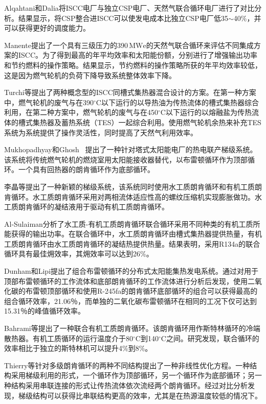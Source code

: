 Alqahtani和Dalia\cite{Alqahtani2016}将ISCC电厂与独立CSP电厂、天然气联合循环电厂进行了对比分析。结果显示，将CSP整合进ISCC可以使发电成本比独立CSP电厂低35$\sim$40\%，并可以获得更好的调度能力。

Manente提出了一个具有三级压力的390$\,\mathrm{MWe}$的天然气联合循环来评估不同集成方案的ISCC。为了得到最高的年平均效率和太阳能份额，分别进行了增强输出功率和节约燃料的操作策略。结果显示，节约燃料的操作策略所获的年平均效率较低，这是因为燃气轮机的负荷下降导致系统整体效率下降。

Turchi等\cite{Turchi2014}提出了两种概念型的ISCC同槽式集热器混合设计的方案。在第一种方案中，燃气轮机的废气与在390$^\circ\mathrm{C}$以下运行的以导热油为传热流体的槽式集热器综合利用，在第二种方案中，燃气轮机的废气与在450$^\circ\mathrm{C}$以下运行的以熔融盐为传热流体的槽式集热器及蓄热系统（TES）一起综合利用。使用燃气轮机余热来补充TES系统为系统提供了操作灵活性，同时提高了天然气利用效率。

Mukhopadhyay和Ghosh~\cite{Mukhopadhyay2016}
提出了一种针对塔式太阳能电厂的热电联产梯级系统。该系统将传统燃气轮机的燃烧室用太阳能接收器替代，以布雷顿循环作为顶部循环。一个具有回热器的朗肯循环作为底部循环。

李晶等\cite{Li2016a}提出了一种新颖的梯级系统，该系统同时使用水工质朗肯循环和有机工质朗肯循环。水工质朗肯循环采用对两相流体适应性高的螺纹压缩机实现膨胀做功。水工质朗肯循环的凝结液用于驱动有机工质朗肯循环。

Al-Sulaiman\cite{AlSulaiman2014}分析了水工质-有机工质朗肯循环联合循环采用不同种类的有机工质所能获得的输出功率。在联合循环中，水工质朗肯循环由槽式集热器提供热量，有机工质朗肯循环由水工质朗肯循环的凝结热提供热量。结果表明，采用R134a的联合循环具有最佳㶲效率，其㶲效率可以达到26\%。

Dunham和Lipi\cite{Dunham2013}提出了组合布雷顿循环的分布式太阳能集热发电系统。通过对用于顶部布雷顿循环的工作流体和底部朗肯循环的工作流体进行分析后发现，使用二氧化碳的布雷顿顶部循环和使用R-245fa的朗肯循环底部循环的组合可以获得最高的组合循环效率，21.06％，而单独的二氧化碳布雷顿循环在相同的工况下仅可达到15.31％的峰值循环效率。

Bahrami等\cite{Bahrami2013}提出了一种联合有机工质朗肯循环。该朗肯循环用作斯特林循环的冷端散热器。有机工质循环的运行温度介于80$\mathrm{^\circ C}$到140$\mathrm{^\circ C}$之间。研究发现，联合循环的效率相比于独立的斯特林机可以提升4\%到8\%。

Thierry等\cite{Thierry2016}针对多级朗肯循环的两种不同结构提出了一种非线性优化方程。一种结构采用梯级利用的形式，一个循环作为顶部循环，另一个循环作为底部循环；另一种结构采用串联连接的形式让传热流体依次流经两个朗肯循环。经过对比分析发现，梯级结构可以获得比串联结构更高的效率，尤其是在热源温度较低的情况下。

